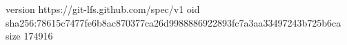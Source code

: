 version https://git-lfs.github.com/spec/v1
oid sha256:78615c7477fe6b8ac870377ca26d9988886922893fc7a3aa33497243b725b6ca
size 174916
